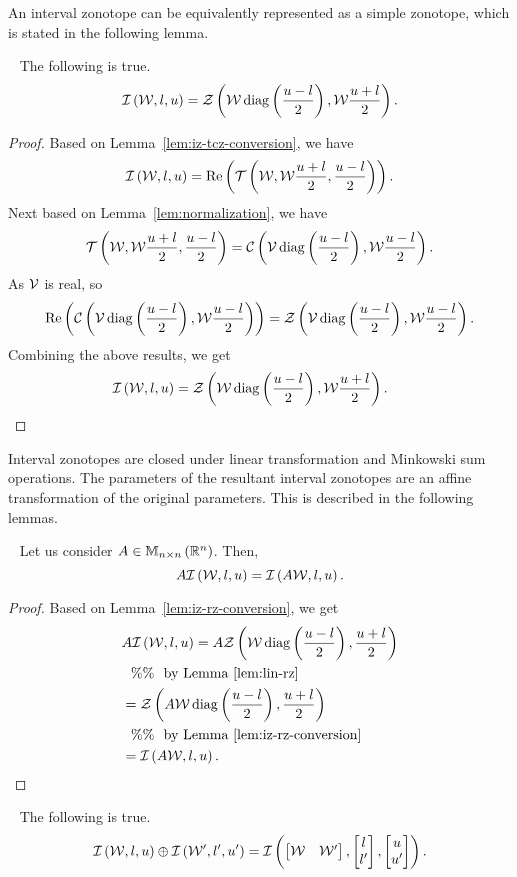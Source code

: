 %
An interval zonotope can be equivalently represented as a simple
zonotope, which is stated in the following lemma.
%
\begin{lemma}~\label{lem:iz-rz-conversion}
The following is true.
%
\[
\mathit{\operatorname{\mathcal{I}}}\left(\mathcal{W},l,u\right)=\mathit{\mathcal{Z}}\left(\mathcal{W}\operatorname{diag}\left(\frac{u-l}{2}\right),\mathcal{W}\frac{u+l}{2}\right).
\]
%
\end{lemma}
%
\begin{proof}
Based on Lemma~\ref{lem:iz-tcz-conversion}, we have 
%
\[
\mathit{\operatorname{\mathcal{I}}}\left(\mathcal{W},l,u\right)=\operatorname{Re}\left(\mathit{\operatorname{\mathcal{T}}}\left(\mathcal{W},\mathcal{W}\frac{u+l}{2},\frac{u-l}{2}\right)\right).
\]
%
Next based on Lemma~\ref{lem:normalization}, we have 
%
\[
\mathit{\operatorname{\mathcal{T}}}\left(\mathcal{W},\mathcal{W}\frac{u+l}{2},\frac{u-l}{2}\right)=\mathit{\mathcal{C}}\left(\mathcal{V}\operatorname{diag}\left(\frac{u-l}{2}\right),\mathcal{W}\frac{u-l}{2}\right).
\]
%
As $\mathcal{V}$ is real, so
%
\[
\operatorname{Re}\left(\mathit{\mathcal{C}}\left(\mathcal{V}\operatorname{diag}\left(\frac{u-l}{2}\right),\mathcal{W}\frac{u-l}{2}\right)\right)=\mathit{\mathcal{Z}}\left(\mathcal{V}\operatorname{diag}\left(\frac{u-l}{2}\right),\mathcal{W}\frac{u-l}{2}\right).
\]
%
Combining the above results, we get
\[
\mathit{\operatorname{\mathcal{I}}}\left(\mathcal{W},l,u\right)=\mathit{\mathcal{Z}}\left(\mathcal{W}\operatorname{diag}\left(\frac{u-l}{2}\right),\mathcal{W}\frac{u+l}{2}\right).~~~~\qedhere
\]
%
\end{proof}
%
Interval zonotopes are closed under linear transformation and
Minkowski sum operations.  The parameters of the resultant interval
zonotopes are an affine transformation of the original parameters.
This is described in the following lemmas.
%
\begin{lemma}~\label{lem:iz-lin-transform}
Let us consider $A\in\mathbb{M}_{n\times n}\left(\mathbb{R}^n\right)$.  Then,
%
\[
A\mathit{\operatorname{\mathcal{I}}}\left(\mathcal{W},l,u\right)=\mathit{\operatorname{\mathcal{I}}}\left(A\mathcal{W},l,u\right).
\]
%
\end{lemma}
%
\begin{proof}
Based on Lemma~\ref{lem:iz-rz-conversion}, we get
%
\begin{align*}
&  A\mathit{\operatorname{\mathcal{I}}}\left(\mathcal{W},l,u\right)
 =
  A\mathit{\mathcal{Z}}\left(\mathcal{W}\operatorname{diag}\left(\frac{u-l}{2}\right),\frac{u+l}{2}\right)\\
  & ~~\%\%~~\text{by Lemma~\ref{lem:lin-rz}}\\
  & = \mathit{\mathcal{Z}}\left(A\mathcal{W}\operatorname{diag}\left(\frac{u-l}{2}\right),\frac{u+l}{2}\right)\\
  & ~~\%\%~~\text{by Lemma~\ref{lem:iz-rz-conversion}}\\
  & = \mathit{\operatorname{\mathcal{I}}}\left(A\mathcal{W},l,u\right).~~~~~\qedhere
\end{align*}
%
\end{proof}
%
\begin{lemma}~\label{lem:iz-min-sum}
The following is true.
%
\[
\mathit{\operatorname{\mathcal{I}}}\left(\mathcal{W},l,u\right)\oplus \mathit{\operatorname{\mathcal{I}}}\left(\mathcal{W}^\prime,l^\prime,u^\prime\right)
= \mathit{\operatorname{\mathcal{I}}}\left(\left[\begin{matrix}\mathcal{W} &
    \mathcal{W}^\prime\end{matrix}\right],\left[\begin{matrix}l\\l^\prime\end{matrix}\right],\left[\begin{matrix}u\\u^\prime\end{matrix}\right]\right). 
\]
%
\end{lemma}
